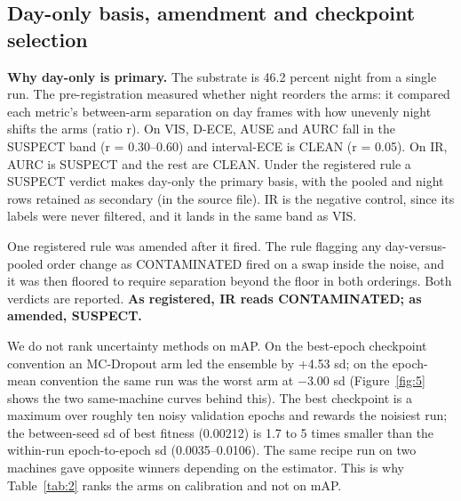 \documentclass[10pt]{article}
\begin{document}
\subsection{Day-only basis, amendment and checkpoint selection}\label{app:F.4}
\textbf{Why day-only is primary.} The substrate is 46.2 percent night from a single run. The pre-registration measured whether night reorders the arms: it compared each metric's between-arm separation on day frames with how unevenly night shifts the arms (ratio r). On VIS, D-ECE, AUSE and AURC fall in the SUSPECT band (r = 0.30--0.60) and interval-ECE is CLEAN (r = 0.05). On IR, AURC is SUSPECT and the rest are CLEAN. Under the registered rule a SUSPECT verdict makes day-only the primary basis, with the pooled and night rows retained as secondary (in the source file). IR is the negative control, since its labels were never filtered, and it lands in the same band as VIS.

One registered rule was amended after it fired. The rule flagging any day-versus-pooled order change as CONTAMINATED fired on a swap inside the noise, and it was then floored to require separation beyond the floor in both orderings. Both verdicts are reported. \textbf{As registered, IR reads CONTAMINATED; as amended, SUSPECT.}

We do not rank uncertainty methods on mAP. On the best-epoch checkpoint convention an MC-Dropout arm led the ensemble by +4.53 sd; on the epoch-mean convention the same run was the worst arm at $-$3.00 sd (Figure~\ref{fig:5} shows the two same-machine curves behind this). The best checkpoint is a maximum over roughly ten noisy validation epochs and rewards the noisiest run; the between-seed sd of best fitness (0.00212) is 1.7 to 5 times smaller than the within-run epoch-to-epoch sd (0.0035--0.0106). The same recipe run on two machines gave opposite winners depending on the estimator. This is why Table~\ref{tab:2} ranks the arms on calibration and not on mAP.
\end{document}
